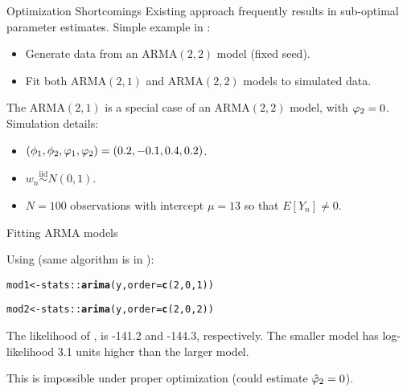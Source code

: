 \documentclass[aspectratio=169]{beamer}\usepackage[]{graphicx}\usepackage[]{xcolor}
\makeatletter
\newcommand{\hlnum}[1]{\textcolor[rgb]{0.686,0.059,0.569}{#1}}%
\newcommand{\hlopt}[1]{\textcolor[rgb]{0,0,0}{#1}}%
\newcommand{\hldef}[1]{\textcolor[rgb]{0.345,0.345,0.345}{#1}}%
\newcommand{\hlkwb}[1]{\textcolor[rgb]{0.69,0.353,0.396}{#1}}%
\newcommand{\hlkwc}[1]{\textcolor[rgb]{0.333,0.667,0.333}{#1}}%
\newcommand{\hlkwd}[1]{\textcolor[rgb]{0.737,0.353,0.396}{\textbf{#1}}}%
\newenvironment{kframe}{%
 \def\at@end@of@kframe{}%
 \ifinner\ifhmode%
  \def\at@end@of@kframe{\end{minipage}}%
  \begin{minipage}{\columnwidth}%
 \fi\fi%
 \def\FrameCommand##1{\hskip\@totalleftmargin \hskip-\fboxsep
 \colorbox{shadecolor}{##1}\hskip-\fboxsep
     \hskip-\linewidth \hskip-\@totalleftmargin \hskip\columnwidth}%
 \MakeFramed {\advance\hsize-\width
   \@totalleftmargin\z@ \linewidth\hsize
   \@setminipage}}%
 {\par\unskip\endMakeFramed%
 \at@end@of@kframe}
\newenvironment{knitrout}{}{} %
\makeatother
\begin{document}
\begin{frame}{Optimization Shortcomings}
Existing approach frequently results in sub-optimal parameter estimates. Simple example in : 
\begin{itemize}
  \item Generate data from an $\mathrm{ARMA}(2, 2)$ model (fixed seed).
  \item Fit both $\mathrm{ARMA}(2, 1)$ and $\mathrm{ARMA}(2, 2)$ models to simulated data.
\end{itemize}
The $\mathrm{ARMA}(2, 1)$ is a special case of an $\mathrm{ARMA}(2, 2)$ model, with $\varphi_2 = 0$. \pause
Simulation details: 
\begin{itemize}
  \item $(\phi_1, \phi_2, \varphi_1, \varphi_2) = (0.2, -0.1, 0.4, 0.2)$.
  \item $w_n \overset{\text{iid}}{\sim} N(0, 1)$. 
  \item $N = 100$ observations with intercept $\mu = 13$ so that $E[Y_n] \neq 0$.
\end{itemize}



\end{frame}

\begin{frame}{Fitting ARMA models}

Using  (same algorithm is in ):

\begin{knitrout}
\color{fgcolor}\begin{kframe}
\begin{alltt}
\hldef{mod1} \hlkwb{<-} \hldef{stats}\hlopt{::}\hlkwd{arima}\hldef{(y,} \hlkwc{order} \hldef{=} \hlkwd{c}\hldef{(}\hlnum{2}\hldef{,} \hlnum{0}\hldef{,} \hlnum{1}\hldef{))}

\hldef{mod2} \hlkwb{<-} \hldef{stats}\hlopt{::}\hlkwd{arima}\hldef{(y,} \hlkwc{order} \hldef{=} \hlkwd{c}\hldef{(}\hlnum{2}\hldef{,} \hlnum{0}\hldef{,} \hlnum{2}\hldef{))}
\end{alltt}
\end{kframe}
\end{knitrout}

\pause 
The likelihood of ,  is -141.2 and -144.3, respectively. The \alert{smaller} model has log-likelihood 3.1 units \alert{higher} than the larger model.

This is impossible under proper optimization (could estimate $\hat{\varphi}_2 = 0$).
\end{frame}
\end{document}

